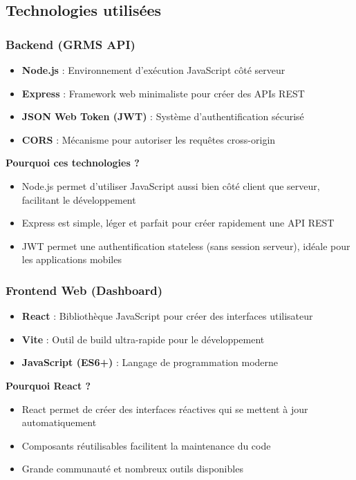 \documentclass[11pt,a4paper]{article}
\begin{document}
\subsection{Technologies utilisées}

\subsubsection{Backend (GRMS API)}

\begin{itemize}
    \item \textbf{Node.js} : Environnement d'exécution JavaScript côté serveur
    \item \textbf{Express} : Framework web minimaliste pour créer des APIs REST
    \item \textbf{JSON Web Token (JWT)} : Système d'authentification sécurisé
    \item \textbf{CORS} : Mécanisme pour autoriser les requêtes cross-origin
\end{itemize}

\textbf{Pourquoi ces technologies ?}
\begin{itemize}
    \item Node.js permet d'utiliser JavaScript aussi bien côté client que serveur, facilitant le développement
    \item Express est simple, léger et parfait pour créer rapidement une API REST
    \item JWT permet une authentification stateless (sans session serveur), idéale pour les applications mobiles
\end{itemize}

\subsubsection{Frontend Web (Dashboard)}

\begin{itemize}
    \item \textbf{React} : Bibliothèque JavaScript pour créer des interfaces utilisateur
    \item \textbf{Vite} : Outil de build ultra-rapide pour le développement
    \item \textbf{JavaScript (ES6+)} : Langage de programmation moderne
\end{itemize}

\textbf{Pourquoi React ?}
\begin{itemize}
    \item React permet de créer des interfaces réactives qui se mettent à jour automatiquement
    \item Composants réutilisables facilitent la maintenance du code
    \item Grande communauté et nombreux outils disponibles
\end{itemize}
\end{document}
